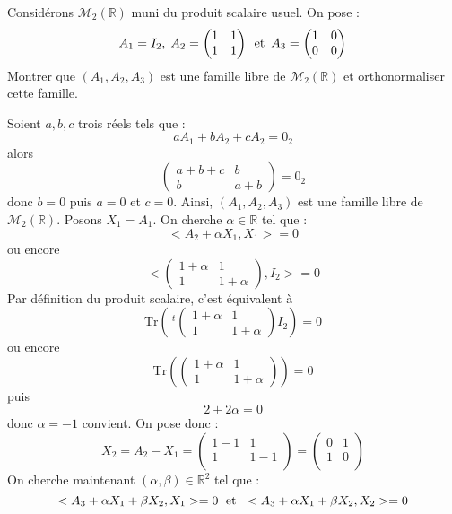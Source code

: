 \documentclass[a4paper,10pt]{report}
\begin{document}
\begin{Exa} Considérons $\mathcal{M}_2(\mathbb{R})$ muni du produit scalaire usuel. On pose :
$$A_1 = I_2, \; A_2 = \begin{pmatrix}
1 & 1 \\
1 & 1 \\
\end{pmatrix} \, \hbox{ et } \, A_3 = \begin{pmatrix}
1 & 0 \\
0 & 0
\end{pmatrix}$$
Montrer que $(A_1,A_2,A_3)$ est une famille libre de $\mathcal{M}_2(\mathbb{R})$ et orthonormaliser cette famille.
\end{Exa}

\corr Soient $a,b,c$ trois réels tels que :
$$ a A_1+bA_2+cA_2= 0_2$$
alors 
$$ \begin{pmatrix}
a+b+c & b \\
b & a+b
\end{pmatrix}=0_2$$
donc $b=0$ puis $a=0$ et $c=0$. Ainsi, $(A_1,A_2,A_3)$ est une famille libre de $\mathcal{M}_2(\mathbb{R})$. Posons $X_1=A_1$. On cherche $\alpha \in \mathbb{R}$ tel que :
$$ <A_2+ \alpha X_1, X_1>=0$$
ou encore 
$$ <\begin{pmatrix}
1+ \alpha & 1 \\
1 & 1+ \alpha
\end{pmatrix}, I_2>=0$$
Par définition du produit scalaire, c'est équivalent à
$$ \textrm{Tr} \left( ~^t{\begin{pmatrix} 1+ \alpha & 1 \\
1 & 1+ \alpha
\end{pmatrix}} I_2 \right)=0$$
ou encore 
$$ \textrm{Tr} \left( \begin{pmatrix} 1+ \alpha & 1 \\
1 & 1+ \alpha
\end{pmatrix} \right)=0$$
puis
$$ 2+ 2 \alpha=0$$
donc $\alpha=-1$ convient. On pose donc :
$$ X_2 = A_2 - X_1 = \begin{pmatrix}
1-1 & 1 \\
1 & 1-1\\
\end{pmatrix}
 = \begin{pmatrix}
0 & 1 \\
1 & 0 \\
\end{pmatrix}$$
On cherche maintenant $(\alpha, \beta) \in \mathbb{R}^2$ tel que :
$$ <A_3+ \alpha X_1+ \beta X_2, X_1>=0 \; \hbox{ et } \; <A_3+ \alpha X_1+ \beta X_2, X_2>=0$$
\end{document}

